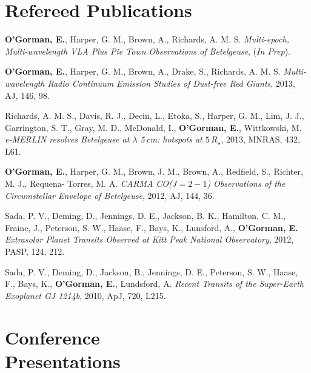 \documentclass[margin,line]{resume}
\begin{document}
\begin{resume}
    \section{\mysidestyle Refereed Publications}

    \textbf{O'Gorman, E.}, Harper, G. M., Brown, A., Richards, A. M. S.
    \textsl{Multi-epoch, Multi-wavelength VLA Plus Pie Town Observations of Betelgeuse},
    (\textit{In Prep}).

\vspace{0mm}
    \textbf{O'Gorman, E.}, Harper, G. M., Brown, A., Drake, S., Richards, A. M. S.
    \textsl{Multi-wavelength Radio Continuum Emission Studies of Dust-free Red Giants},
    2013, AJ, 146, 98.

\vspace{0mm}
    Richards, A. M. S., Davis, R. J., Decin, L., Etoka, S., Harper, G. M., Lim, J. J., Garrington, S. T., Gray, 	M. D., McDonald, I., \textbf{O'Gorman, E.}, Wittkowski, M.
    \textsl{e-MERLIN resolves Betelgeuse at $\lambda$ 5\,cm: hotspots at $5\,R_{\star}$},
    2013, MNRAS, 432, L61.

\vspace{0mm}
	\textbf{O'Gorman, E.}, Harper, G. M., Brown, J. M., Brown, A., Redfield, S., Richter, M. J., Requena-			Torres, M. A.
    \textsl{CARMA CO($J = 2-1$) Observations of the Circumstellar Envelope of Betelgeuse},
    2012, AJ, 144, 36.

\vspace{0mm}
	Sada, P. V., Deming, D., Jennings, D. E., Jackson, B. K., Hamilton, C. M., Fraine, J., Peterson, S. W., 		Haase, F., Bays, K., Lunsford, A., \textbf{O'Gorman, E.}
    \textsl{Extrasolar Planet Transits Observed at Kitt Peak National Observatory},
    2012, PASP, 124, 212.

\vspace{0mm}
	Sada, P. V., Deming, D., Jackson, B., Jennings, D. E., Peterson, S. W., Haase, F., Bays, K., \textbf{O'Gorman, E.}, Lundsford, A.
    \textsl{Recent Transits of the Super-Earth Exoplanet GJ 1214b},
    2010, ApJ, 720, L215.



    \vspace{2mm}
    \section{\mysidestyle Conference\\Presentations}


\end{resume}
\end{document}
